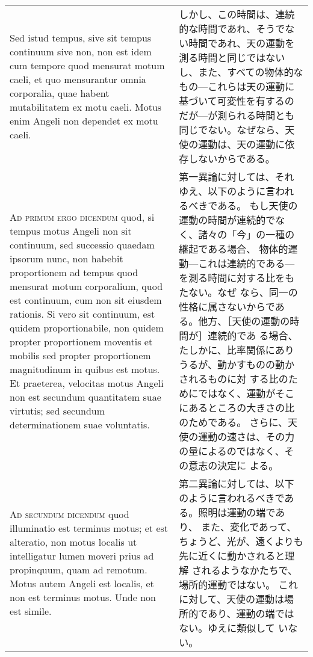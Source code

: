 \documentclass[10pt]{jsarticle} %
\begin{document}
\begin{longtable}{p{21em}p{21em}}
\\




Sed istud tempus, sive sit tempus continuum sive
non, non est idem cum tempore quod mensurat motum caeli, et quo
mensurantur omnia corporalia, quae habent mutabilitatem ex motu
caeli. Motus enim Angeli non dependet ex motu caeli.

&

しかし、この時間は、連続的な時間であれ、そうでない時間であれ、天の運動を
 測る時間と同じではないし、また、すべての物体的なもの---これらは天の運動に
 基づいて可変性を有するのだが---が測られる時間とも同じでない。なぜなら、天
 使の運動は、天の運動に依存しないからである。

\\


{\scshape Ad primum ergo dicendum} quod, si tempus motus
Angeli non sit continuum, sed successio quaedam ipsorum nunc, non
habebit proportionem ad tempus quod mensurat motum corporalium, quod est
continuum, cum non sit eiusdem rationis. Si vero sit continuum, est
quidem proportionabile, non quidem propter proportionem moventis et
mobilis sed propter proportionem magnitudinum in quibus est motus. Et
praeterea, velocitas motus Angeli non est secundum quantitatem suae
virtutis; sed secundum determinationem suae voluntatis.

&

第一異論に対しては、それゆえ、以下のように言われるべきである。
もし天使の運動の時間が連続的でなく、諸々の「今」の一種の継起である場合、
 物体的運動---これは連続的である---を測る時間に対する比をもたない。なぜ
 なら、同一の性格に属さないからである。他方、［天使の運動の時間が］連続的であ
 る場合、たしかに、比率関係にありうるが、動かすものの動かされるものに対
 する比のためにではなく、運動がそこにあるところの大きさの比のためである。
さらに、天使の運動の速さは、その力の量によるのではなく、その意志の決定に
 よる。

\\


{\scshape Ad secundum dicendum} quod illuminatio est
terminus motus; et est alteratio, non motus localis ut intelligatur
lumen moveri prius ad propinquum, quam ad remotum. Motus autem Angeli
est localis, et non est terminus motus. Unde non est simile.

&

第二異論に対しては、以下のように言われるべきである。照明は運動の端であり、
また、変化であって、ちょうど、光が、遠くよりも先に近くに動かされると理解
されるようなかたちで、場所的運動ではない。
これに対して、天使の運動は場所的であり、運動の端ではない。ゆえに類似して
 いない。


\end{longtable}
\end{document}
